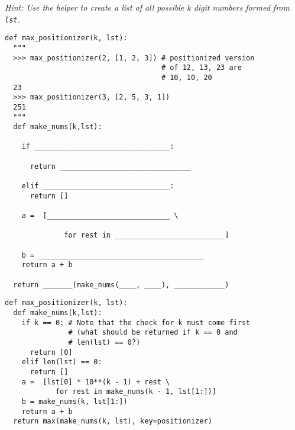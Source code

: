 \begin{parts}
\textit{Hint: Use the helper to create a list of all possible k digit numbers formed from \lstinline{lst}.}

\begin{lstlisting}
def max_positionizer(k, lst):
  """
  >>> max_positionizer(2, [1, 2, 3]) # positionized version 
                                     # of 12, 13, 23 are 
                                     # 10, 10, 20 
  23
  >>> max_positionizer(3, [2, 5, 3, 1])
  251
  """
  def make_nums(k,lst):

    if ________________________________:

      return _______________________________

    elif ______________________________:
      return []

    a =  [_____________________________ \
    
              for rest in __________________________]

    b = _______________________________________
    return a + b

  return _______(make_nums(____, ____), ____________)
\end{lstlisting}
\begin{solution}
\begin{lstlisting}
def max_positionizer(k, lst):
  def make_nums(k,lst):
    if k == 0: # Note that the check for k must come first 
               # (what should be returned if k == 0 and 
               # len(lst) == 0?)
      return [0]
    elif len(lst) == 0:
      return []
    a =  [lst[0] * 10**(k - 1) + rest \
            for rest in make_nums(k - 1, lst[1:])]
    b = make_nums(k, lst[1:])
    return a + b
  return max(make_nums(k, lst), key=positionizer)
\end{lstlisting}
\end{solution}
\end{parts}